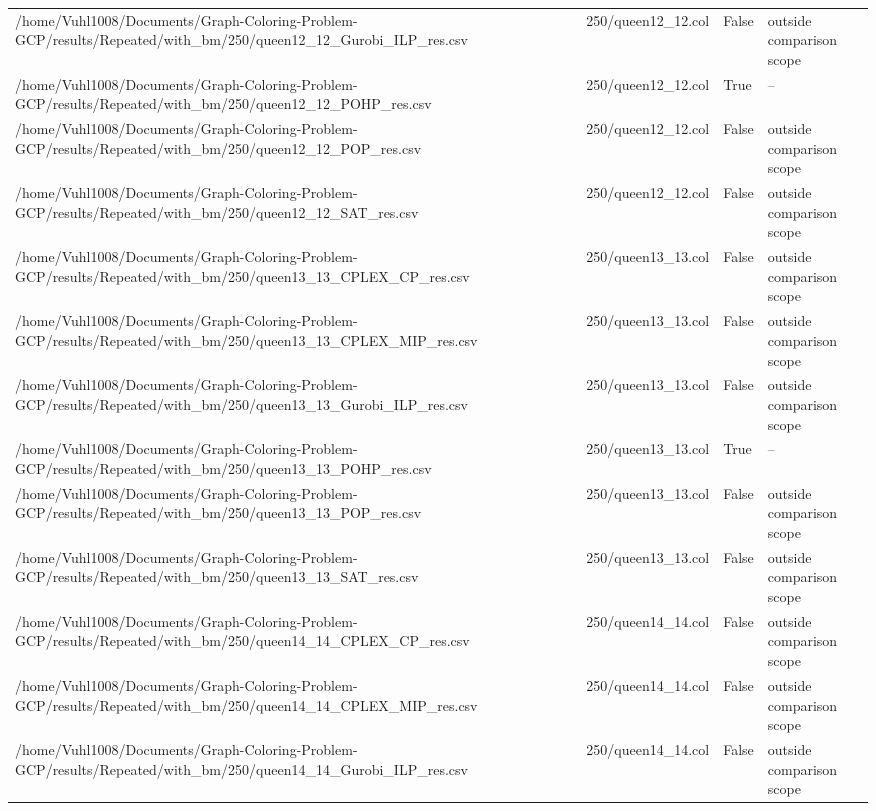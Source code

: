 \begin{table}[htbp]
\begin{tabular}{llll}
/home/Vuhl1008/Documents/Graph-Coloring-Problem-GCP/results/Repeated/with\_bm/250/queen12\_12\_Gurobi\_ILP\_res.csv & 250/queen12\_12.col & False & outside comparison scope \\
/home/Vuhl1008/Documents/Graph-Coloring-Problem-GCP/results/Repeated/with\_bm/250/queen12\_12\_POHP\_res.csv & 250/queen12\_12.col & True & -- \\
/home/Vuhl1008/Documents/Graph-Coloring-Problem-GCP/results/Repeated/with\_bm/250/queen12\_12\_POP\_res.csv & 250/queen12\_12.col & False & outside comparison scope \\
/home/Vuhl1008/Documents/Graph-Coloring-Problem-GCP/results/Repeated/with\_bm/250/queen12\_12\_SAT\_res.csv & 250/queen12\_12.col & False & outside comparison scope \\
/home/Vuhl1008/Documents/Graph-Coloring-Problem-GCP/results/Repeated/with\_bm/250/queen13\_13\_CPLEX\_CP\_res.csv & 250/queen13\_13.col & False & outside comparison scope \\
/home/Vuhl1008/Documents/Graph-Coloring-Problem-GCP/results/Repeated/with\_bm/250/queen13\_13\_CPLEX\_MIP\_res.csv & 250/queen13\_13.col & False & outside comparison scope \\
/home/Vuhl1008/Documents/Graph-Coloring-Problem-GCP/results/Repeated/with\_bm/250/queen13\_13\_Gurobi\_ILP\_res.csv & 250/queen13\_13.col & False & outside comparison scope \\
/home/Vuhl1008/Documents/Graph-Coloring-Problem-GCP/results/Repeated/with\_bm/250/queen13\_13\_POHP\_res.csv & 250/queen13\_13.col & True & -- \\
/home/Vuhl1008/Documents/Graph-Coloring-Problem-GCP/results/Repeated/with\_bm/250/queen13\_13\_POP\_res.csv & 250/queen13\_13.col & False & outside comparison scope \\
/home/Vuhl1008/Documents/Graph-Coloring-Problem-GCP/results/Repeated/with\_bm/250/queen13\_13\_SAT\_res.csv & 250/queen13\_13.col & False & outside comparison scope \\
/home/Vuhl1008/Documents/Graph-Coloring-Problem-GCP/results/Repeated/with\_bm/250/queen14\_14\_CPLEX\_CP\_res.csv & 250/queen14\_14.col & False & outside comparison scope \\
/home/Vuhl1008/Documents/Graph-Coloring-Problem-GCP/results/Repeated/with\_bm/250/queen14\_14\_CPLEX\_MIP\_res.csv & 250/queen14\_14.col & False & outside comparison scope \\
/home/Vuhl1008/Documents/Graph-Coloring-Problem-GCP/results/Repeated/with\_bm/250/queen14\_14\_Gurobi\_ILP\_res.csv & 250/queen14\_14.col & False & outside comparison scope \\

\end{tabular}
\end{table}
